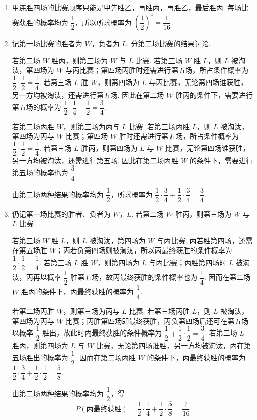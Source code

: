 \begin{solution}
\begin{enumerate}
\item 甲连胜四场的比赛顺序只能是甲先胜乙，再胜丙，再胜乙，最后胜丙. 每场比赛获胜的概率均为 \(\dfrac{1}{2}\)，所以所求概率为 \(\left(\dfrac{1}{2}\right)^4=\dfrac{1}{16}\).

\item 记第一场比赛的胜者为 \(W\)，负者为 \(L\). 分第二场比赛的结果讨论.

若第二场 \(W\) 胜丙，则第三场为 \(W\) 与 \(L\) 比赛. 若第三场 \(W\) 胜 \(L\)，则 \(L\) 被淘汰，第四场为 \(W\) 与丙比赛；第四场丙胜时还需进行第五场，所占条件概率为 \(\dfrac{1}{2}\cdot\dfrac{1}{2}=\dfrac{1}{4}\). 若第三场 \(L\) 胜 \(W\)，则第四场为 \(L\) 与丙比赛，无论第四场谁获胜，另一方均被淘汰，还需进行第五场. 因此在第二场 \(W\) 胜丙的条件下，需要进行第五场的概率为 \(\dfrac{1}{2}\cdot\dfrac{1}{4}+\dfrac{1}{2}=\dfrac{3}{4}\).

若第二场丙胜 \(W\)，则第三场为丙与 \(L\) 比赛. 若第三场丙胜 \(L\)，则 \(L\) 被淘汰，第四场为丙与 \(W\) 比赛；第四场 \(W\) 胜时还需进行第五场，所占条件概率为 \(\dfrac{1}{2}\cdot\dfrac{1}{2}=\dfrac{1}{4}\). 若第三场 \(L\) 胜丙，则第四场为 \(L\) 与 \(W\) 比赛，无论第四场谁获胜，另一方均被淘汰，还需进行第五场. 因此在第二场丙胜 \(W\) 的条件下，需要进行第五场的概率也为 \(\dfrac{3}{4}\).

由第二场两种结果的概率均为 \(\dfrac{1}{2}\)，所求概率为 \(\dfrac{1}{2}\cdot\dfrac{3}{4}+\dfrac{1}{2}\cdot\dfrac{3}{4}=\dfrac{3}{4}\).

\item 仍记第一场比赛的胜者、负者为 \(W\)，\(L\). 若第二场 \(W\) 胜丙，则第三场为 \(W\) 与 \(L\) 比赛.

若第三场 \(W\) 胜 \(L\)，则 \(L\) 被淘汰，第四场为 \(W\) 与丙比赛. 丙若胜第四场，还需在第五场胜 \(W\)；丙若负第四场则被淘汰，所以丙最终获胜的条件概率为 \(\dfrac{1}{2}\cdot\dfrac{1}{2}=\dfrac{1}{4}\). 若第三场 \(L\) 胜 \(W\)，则第四场为 \(L\) 与丙比赛；丙胜第四场时 \(L\) 被淘汰，丙再以概率 \(\dfrac{1}{2}\) 胜第五场，故丙最终获胜的条件概率也为 \(\dfrac{1}{4}\). 因而在第二场 \(W\) 胜丙的条件下，丙最终获胜的概率为 \(\dfrac{1}{4}\).

若第二场丙胜 \(W\)，则第三场为丙与 \(L\) 比赛. 若第三场丙胜 \(L\)，则 \(L\) 被淘汰，第四场为丙与 \(W\) 比赛；丙胜第四场即最终获胜，丙负第四场后还可在第五场以概率 \(\dfrac{1}{2}\) 胜出，故此时丙最终获胜的条件概率为 \(\dfrac{1}{2}+\dfrac{1}{2}\cdot\dfrac{1}{2}=\dfrac{3}{4}\). 若第三场 \(L\) 胜丙，则第四场为 \(L\) 与 \(W\) 比赛，无论第四场谁胜，另一方均被淘汰，丙在第五场胜出的概率为 \(\dfrac{1}{2}\). 因而在第二场丙胜 \(W\) 的条件下，丙最终获胜的概率为 \(\dfrac{1}{2}\cdot\dfrac{3}{4}+\dfrac{1}{2}\cdot\dfrac{1}{2}=\dfrac{5}{8}\).

由第二场两种结果的概率均为 \(\dfrac{1}{2}\)，得
\[
P(\text{丙最终获胜})=\dfrac{1}{2}\cdot\dfrac{1}{4}+\dfrac{1}{2}\cdot\dfrac{5}{8}=\dfrac{7}{16}
\]
\end{enumerate}
\end{solution}

